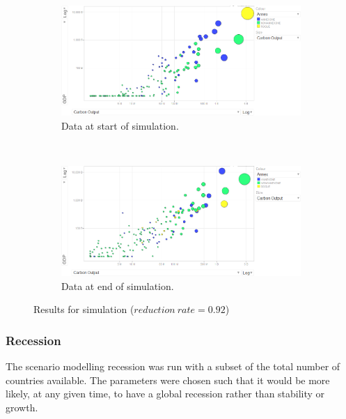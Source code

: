 \begin{figure}[H]
		\centering
        \begin{subfigure}[b]{\textwidth}
                \centering
                \includegraphics[width=\textwidth]{img/simulations/352-reduction-rate-before.png}
				\caption{Data at start of simulation.}
				\label{subfig:352-1}
        \end{subfigure}
        \\
        \begin{subfigure}[b]{\textwidth}
                \centering
                \includegraphics[width=\textwidth]{img/simulations/352-reduction-rate-after.png}
				\caption{Data at end of simulation.}
				\label{subfig:352-2}
        \end{subfigure}
        \caption{Results for simulation ($reduction~rate=0.92$)}\label{fig:352}
\end{figure}

\subsubsection{Recession}

The scenario modelling recession was run with a subset of the total number of countries available. The parameters were chosen such that it would be more likely, at any given time, to have a global recession rather than stability or growth.

